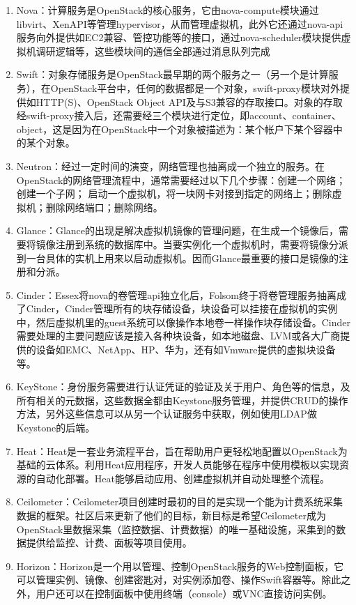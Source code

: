 \begin{enumerate}
\item Nova：计算服务是OpenStack的核心服务，它由nova-compute模块通过libvirt、XenAPI等管理hypervisor，从而管理虚拟机，此外它还通过nova-api服务向外提供如EC2兼容、管控功能等的接口，通过nova-scheduler模块提供虚拟机调研逻辑等，这些模块间的通信全部通过消息队列完成
\item Swift：对象存储服务是OpenStack最早期的两个服务之一（另一个是计算服务），在OpenStack平台中，任何的数据都是一个对象，swift-proxy模块对外提供如HTTP(S)、OpenStack Object API及与S3兼容的存取接口。对象的存取经swift-proxy接入后，还需要经三个模块进行定位，即account、container、object，这是因为在OpenStack中一个对象被描述为：某个帐户下某个容器中的某个对象。
\item Neutron：经过一定时间的演变，网络管理也抽离成一个独立的服务。在OpenStack的网络管理流程中，通常需要经过以下几个步骤：创建一个网络； 创建一个子网； 启动一个虚拟机，将一块网卡对接到指定的网络上；删除虚拟机；删除网络端口；删除网络。
\item Glance：Glance的出现是解决虚拟机镜像的管理问题，在生成一个镜像后，需要将镜像注册到系统的数据库中。当要实例化一个虚拟机时，需要将镜像分派到一台具体的实机上用来以启动虚拟机。因而Glance最重要的接口是镜像的注册和分派。
\item Cinder：Essex将nova的卷管理api独立化后，Folsom终于将卷管理服务抽离成了Cinder，Cinder管理所有的块存储设备，块设备可以挂接在虚拟机的实例中，然后虚拟机里的guest系统可以像操作本地卷一样操作块存储设备。Cinder需要处理的主要问题应该是接入各种块设备，如本地磁盘、LVM或各大广商提供的设备如EMC、NetApp、HP、华为，还有如Vmware提供的虚拟块设备等。
\item KeyStone：身份服务需要进行认证凭证的验证及关于用户、角色等的信息，及所有相关的元数据，这些数据全都由Keystone服务管理，并提供CRUD的操作方法，另外这些信息可以从另一个认证服务中获取，例如使用LDAP做Keystone的后端。
\item Heat：Heat是一套业务流程平台，旨在帮助用户更轻松地配置以OpenStack为基础的云体系。利用Heat应用程序，开发人员能够在程序中使用模板以实现资源的自动化部署。Heat能够启动应用、创建虚拟机并自动处理整个流程。
\item Ceilometer：Ceilometer项目创建时最初的目的是实现一个能为计费系统采集数据的框架。社区后来更新了他们的目标，新目标是希望Ceilometer成为OpenStack里数据采集（监控数据、计费数据）的唯一基础设施，采集到的数据提供给监控、计费、面板等项目使用。
\item Horizon：Horizon是一个用以管理、控制OpenStack服务的Web控制面板，它可以管理实例、镜像、创建密匙对，对实例添加卷、操作Swift容器等。除此之外，用户还可以在控制面板中使用终端（console）或VNC直接访问实例。
\end{enumerate}
